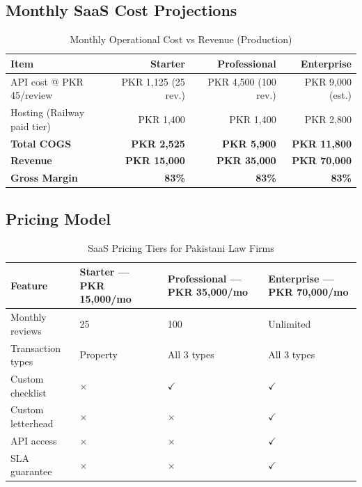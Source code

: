 \documentclass[12pt, a4paper]{article}
\begin{document}
\subsection{Monthly SaaS Cost Projections}

\begin{table}[h]
\centering
\caption{Monthly Operational Cost vs Revenue (Production)}
\renewcommand{\arraystretch}{1.3}
\begin{tabularx}{\textwidth}{Xrrr}
\toprule
\textbf{Item}
    & \textbf{Starter}
    & \textbf{Professional}
    & \textbf{Enterprise} \\
\midrule
API cost @ PKR 45/review
    & PKR 1,125 (25 rev.)
    & PKR 4,500 (100 rev.)
    & PKR 9,000 (est.) \\
Hosting (Railway paid tier)
    & PKR 1,400
    & PKR 1,400
    & PKR 2,800 \\
\textbf{Total COGS}
    & \textbf{PKR 2,525}
    & \textbf{PKR 5,900}
    & \textbf{PKR 11,800} \\
\midrule
\textbf{Revenue}
    & \textbf{PKR 15,000}
    & \textbf{PKR 35,000}
    & \textbf{PKR 70,000} \\
\textbf{Gross Margin}
    & \textbf{83\%}
    & \textbf{83\%}
    & \textbf{83\%} \\
\bottomrule
\end{tabularx}
\label{tab:projections}
\end{table}

\subsection{Pricing Model}

\begin{table}[h]
\centering
\caption{SaaS Pricing Tiers for Pakistani Law Firms}
\renewcommand{\arraystretch}{1.3}
\begin{tabularx}{\textwidth}{lXXX}
\toprule
\textbf{Feature}
    & \textbf{Starter --- PKR 15,000/mo}
    & \textbf{Professional --- PKR 35,000/mo}
    & \textbf{Enterprise --- PKR 70,000/mo} \\
\midrule
Monthly reviews     & 25          & 100              & Unlimited \\
Transaction types   & Property    & All 3 types      & All 3 types \\
Custom checklist    & $\times$    & $\checkmark$     & $\checkmark$ \\
Custom letterhead   & $\times$    & $\times$         & $\checkmark$ \\
API access          & $\times$    & $\times$         & $\checkmark$ \\
SLA guarantee       & $\times$    & $\times$         & $\checkmark$ \\
\bottomrule
\end{tabularx}
\label{tab:pricing}
\end{table}
\end{document}
